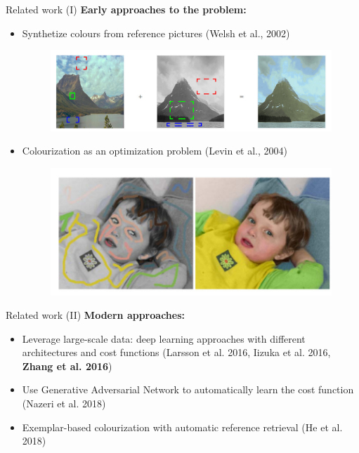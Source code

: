 \documentclass{beamer}
\begin{document}
\begin{frame}{Related work (I)}
  \textbf{Early approaches to the problem:}

    \medskip

    \begin{itemize}
      \item Synthetize colours from reference pictures (Welsh et al., 2002)

      \begin{figure}[!htb]
          \includegraphics[width=\linewidth]{resources/welsh.jpg}
        \endminipage
      \end{figure}

      \medskip

      \item Colourization as an optimization problem (Levin et al., 2004)

      \begin{figure}[!htb]
          \includegraphics[width=\linewidth]{resources/levin.jpg}
        \endminipage
      \end{figure}
    \end{itemize}
\end{frame}

\begin{frame}{Related work (II)}
  \textbf{Modern approaches:}
    \begin{itemize}
      \item Leverage large-scale data: deep learning approaches with different
            architectures and cost functions (Larsson et al. 2016,
            Iizuka et al. 2016, \textbf{Zhang et al. 2016})
      \item Use Generative Adversarial Network to automatically learn the cost
            function (Nazeri et al. 2018)
      \item Exemplar-based colourization with automatic reference retrieval
            (He et al. 2018)
    \end{itemize}
\end{frame}
\end{document}
